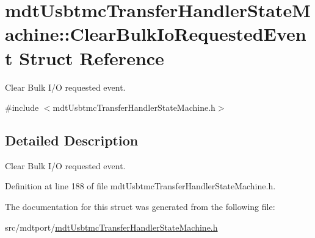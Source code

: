 \hypertarget{structmdt_usbtmc_transfer_handler_state_machine_1_1_clear_bulk_io_requested_event}{\section{mdt\-Usbtmc\-Transfer\-Handler\-State\-Machine\-:\-:Clear\-Bulk\-Io\-Requested\-Event Struct Reference}
\label{structmdt_usbtmc_transfer_handler_state_machine_1_1_clear_bulk_io_requested_event}
}


Clear Bulk I/\-O requested event.  




{\ttfamily \#include $<$mdt\-Usbtmc\-Transfer\-Handler\-State\-Machine.\-h$>$}



\subsection{Detailed Description}
Clear Bulk I/\-O requested event. 

Definition at line 188 of file mdt\-Usbtmc\-Transfer\-Handler\-State\-Machine.\-h.



The documentation for this struct was generated from the following file\-:\begin{DoxyCompactItemize}
\item 
src/mdtport/\hyperlink{mdt_usbtmc_transfer_handler_state_machine_8h}{mdt\-Usbtmc\-Transfer\-Handler\-State\-Machine.\-h}\end{DoxyCompactItemize}

